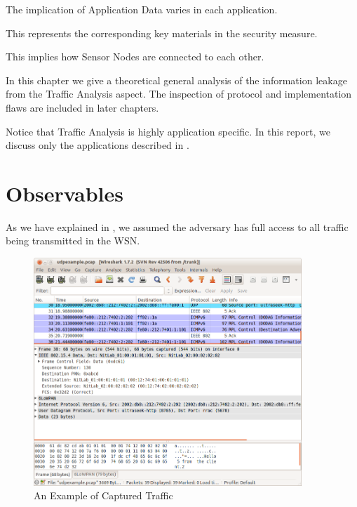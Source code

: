 \begin{description}[style=nextline]
	\item[Content and Size of Application Data]
	The implication of Application Data varies in each application.
	
	\item[Cryptographic Key]
	This represents the corresponding key materials in the security measure.
	
	\item[Network Topology]
	This implies how Sensor Nodes are connected to each other.
	
\end{description}

In this chapter we give a theoretical general analysis of the information leakage from the Traffic Analysis aspect. The inspection of protocol and implementation flaws are included in later chapters.

Notice that Traffic Analysis is highly application specific. In this report, we discuss only the applications described in . 

\section{Observables} \label{Sec: Observables}

As we have explained in , we assumed the adversary has full access to all traffic being transmitted in the WSN. 

\begin{figure}[h!]
	\center
	\includegraphics[width=0.9\textwidth]{fig/udpexample.png}
	\caption{An Example of Captured Traffic}
	\label{Fig: An Example of Captured Traffic}
\end{figure}

